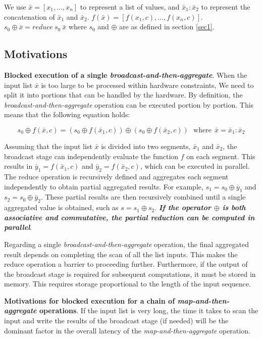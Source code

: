 We use $\bar{x}=[x_1, \ldots, x_n]$ to represent a list of values, and $\bar{x}_1:\bar{x}_2$ to represent the concatenation of $\bar{x}_1$ and $\bar{x}_2$.
$f(\bar{x}) = [f(x_1, c), \ldots, f(x_n, c)]$. $s_0 \oplus \bar{x} = \textit{reduce} \ s_0\  \bar{x}$ where $s_0$ and $\oplus$ are as defined in section \ref{sec1}.

\subsection{Motivations}

\textbf{Blocked execution of a single \textit{broadcast-and-then-aggregate}}.
When the input list $\bar{x}$ is too large to be processed within hardware constraints,
We need to split it into portions that can be handled by the hardware.
By definition, the \textit{broadcast-and-then-aggregate} operation can be executed portion by portion. This means that the following equation holds:

\begin{equation}
s_0 \oplus f(\bar{x},c) = \left(s_0 \oplus f(\bar{x}_1,c)\right) \oplus \left(s_0 \oplus f(\bar{x}_2,c)\right)\ \ \ \text{where}\ \ \bar{x} = \bar{x}_1 : \bar{x}_2
\end{equation}

Assuming that the input list $\bar{x}$ is divided into two segments, $\bar{x}_1$ and $\bar{x}_2$, the broadcast stage can independently evaluate the function $f$ on each segment.
This results in $\bar{y}_1 = f(\bar{x}_1,c)$ and $\bar{y}_2 = f(\bar{x}_2,c)$, which can be executed in parallel.
The reduce operation is recursively defined and aggregates each segment independently to obtain partial aggregated results.
For example, $s_1 = s_0 \oplus \bar{y}_1$ and $s_2 = s_0 \oplus \bar{y}_2$.
These partial results are then recursively combined until a single aggregated value is obtained, such as $s = s_1 \oplus s_2$.
\textbf{\textit{If the operator $\oplus$ is both associative and commutative, the partial reduction can be computed in parallel}}.

Regarding a single \textit{broadcast-and-then-aggregate} operation, the final aggregated result depends on completing the scan of all the list inputs.
This makes the reduce operation a barrier to proceeding further.
Furthermore, if the output of the broadcast stage is required for subsequent computations,
it must be stored in memory. This requires storage proportional to the length of the input sequence.

\textbf{Motivations for blocked execution for a chain of \textit{map-and-then-aggregate} operations}.
If the input list is very long, the time it takes to scan the input and write the results of the broadcast stage (if needed) will be the dominant factor in the overall latency of the \textit{map-and-then-aggregate} operation.

